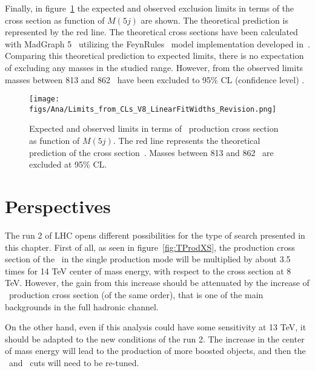Finally, in figure~\ref{fig:Lim} the expected and observed exclusion limits in terms of the cross section as function of $M(5j)$ are shown. The theoretical prediction is represented by the red line. The theoretical cross sections have been calculated with MadGraph 5~\cite{Alwall:2014hca, Alwall:2011uj} utilizing the FeynRules~\cite{Alloul:2013bka} model implementation developed in~\cite{Buchkremer:2013bha, Cacciapaglia:2011fx}. Comparing this theoretical prediction to expected limits, there is no expectation of excluding any masses in the studied range. However, from the observed limits masses between 813 and 862 \GeVcc~have been excluded to 95\% CL (confidence level) .

\begin{figure}[!Hhtbp]
  \begin{center}
    \texttt{[image: figs/Ana/Limits\_from\_CLs\_V8\_LinearFitWidths\_Revision.png]}
    \caption{Expected and observed limits in terms of \Tp~production cross section as function of $M(5j)$. The red line represents the theoretical prediction of the cross section~\cite{Buchkremer:2013bha, Cacciapaglia:2011fx}. Masses between 813 and 862 \GeVcc~are excluded at 95\% CL.}
    \label{fig:Lim}
  \end{center}
\end{figure}

\section{Perspectives}
\label{sec:pers}

The run 2 of LHC opens different possibilities for the type of search presented in this chapter. First of all, as seen in figure~\ref{fig:TProdXS}, the production cross section of the \Tp~in the single production mode will be multiplied by about 3.5 times for 14 TeV center of mass energy, with respect to the cross section at 8 TeV. However, the gain from this increase should be attenuated by the increase of \ttbar~production cross section (of the same order), that is one of the main backgrounds in the full hadronic channel. 

On the other hand, even if this analysis could have some sensitivity at 13 TeV, it should be adapted to the new conditions of the run 2. The increase in the center of mass energy will lead to the production of more boosted objects, and then the \pt~and \HT~cuts will need to be re-tuned. 

